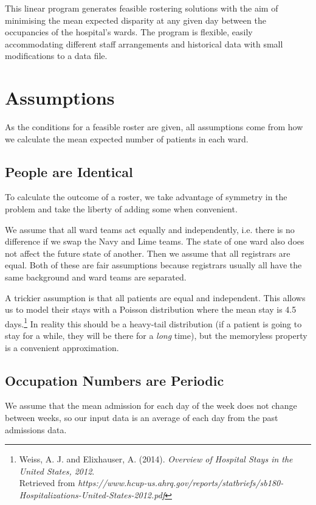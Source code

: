 \documentclass[a4paper]{article}
\begin{document}
This linear program generates feasible rostering solutions with the aim of minimising the mean expected disparity at any given day between the occupancies of the hospital's wards. The program is flexible, easily accommodating different staff arrangements and historical data with small modifications to a data file.

\section{Assumptions}

As the conditions for a feasible roster are given, all assumptions come from how we calculate the mean expected number of patients in each ward.

\subsection{People are Identical}

To calculate the outcome of a roster, we take advantage of symmetry in the problem and take the liberty of adding some when convenient.

We assume that all ward teams act equally and independently, i.e. there is no difference if we swap the Navy and Lime teams. The state of one ward also does not affect the future state of another. Then we assume that all registrars are equal. Both of these are fair assumptions because registrars usually all have the same background and ward teams are separated.

A trickier assumption is that all patients are equal and independent. This allows us to model their stays with a Poisson distribution where the mean stay is 4.5 days.\footnote{Weiss, A. J. and Elixhauser, A. (2014). \emph{Overview of Hospital Stays in the United States, 2012}.\\Retrieved from \emph{https://www.hcup-us.ahrq.gov/reports/statbriefs/sb180-Hospitalizations-United-States-2012.pdf}} In reality this should be a heavy-tail distribution (if a patient is going to stay for a while, they will be there for a \emph{long} time), but the memoryless property is a convenient approximation.

\subsection{Occupation Numbers are Periodic}

We assume that the mean admission for each day of the week does not change between weeks, so our input data is an average of each day from the past admissions data.
\end{document}
